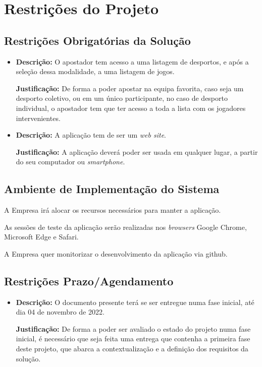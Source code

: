 \chapter{Restrições do Projeto}  
\setcounter{resnum}{1}

\section{Restrições Obrigatórias da Solução}
\begin{itemize}
    \item \textbf{Descrição:} O apostador tem acesso a uma listagem de desportos, e após a seleção dessa modalidade, a uma listagem de jogos. 
    
    \textbf{Justificação:} De forma a poder apostar na equipa favorita, caso seja um desporto coletivo, ou em um único participante, no caso de desporto individual, o apostador tem que ter acesso a toda a lista com os jogadores intervenientes.
    
    \item \textbf{Descrição:} A aplicação tem de ser um \textit{web site}. 
    
    \textbf{Justificação:}  A aplicação deverá poder ser usada em qualquer lugar, a partir do seu computador ou \textit{smartphone}.
\end{itemize}

\section{Ambiente de Implementação do Sistema}
A Empresa irá alocar os recursos necessários para manter a aplicação.

As sessões de teste da aplicação serão realizadas nos \textit{browsers} Google Chrome, Microsoft Edge e Safari.

A Empresa quer monitorizar o desenvolvimento da aplicação via github.


\section{Restrições Prazo/Agendamento}
\begin{itemize}
    \item \textbf{Descrição:} O documento presente terá se ser entregue numa fase inicial, até dia 04 de novembro de 2022.
    
    \textbf{Justificação:} De forma a poder ser avaliado o estado do projeto numa fase inicial, é necessário que seja feita uma entrega que contenha a primeira fase deste projeto, que abarca a contextualização e a definição dos requisitos da solução.
\end{itemize}

